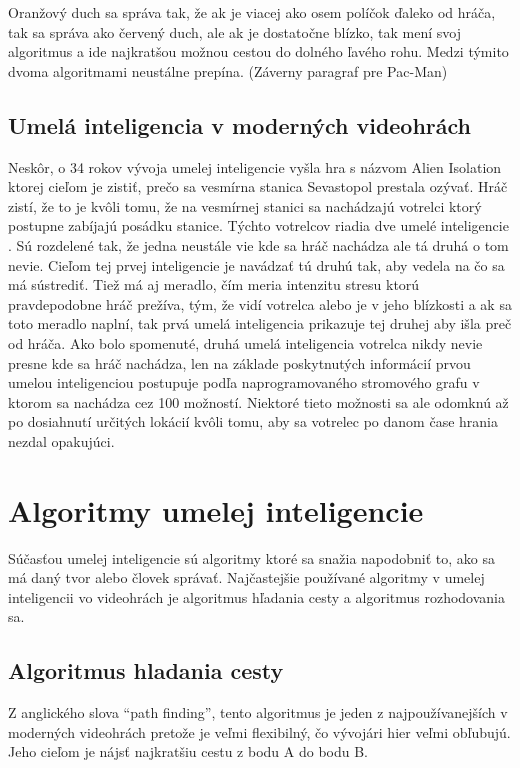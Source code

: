 \documentclass[10pt,oneside,slovak,a4paper]{article}
\begin{document}
Oranžový duch sa správa tak, že ak je viacej ako osem políčok ďaleko od hráča, tak sa správa ako červený duch, ale ak je dostatočne blízko, tak mení svoj algoritmus a ide najkratšou možnou cestou do dolného ľavého rohu. Medzi týmito dvoma algoritmami neustálne prepína.
(Záverny paragraf pre Pac-Man)

\subsection{Umelá inteligencia v moderných videohrách} \label{kapitola2.3}
Neskôr, o 34 rokov vývoja umelej inteligencie vyšla hra s názvom Alien Isolation ktorej cieľom je zistiť, prečo sa vesmírna stanica Sevastopol prestala ozývať. Hráč zistí, že to je kvôli tomu, že na vesmírnej stanici sa nachádzajú votrelci ktorý postupne zabíjajú posádku stanice. Týchto votrelcov riadia dve umelé inteligencie \cite{AlienIsolationAI}. Sú rozdelené tak, že jedna neustále vie kde sa hráč nachádza ale tá druhá o tom nevie. Cieľom tej prvej inteligencie je navádzať tú druhú tak, aby vedela na čo sa má sústrediť. Tiež má aj meradlo, čím meria intenzitu stresu ktorú pravdepodobne hráč prežíva, tým, že vidí votrelca alebo je v jeho blízkosti a ak sa toto meradlo naplní, tak prvá umelá inteligencia prikazuje tej druhej aby išla preč od hráča. Ako bolo spomenuté, druhá umelá inteligencia votrelca nikdy nevie presne kde sa hráč nachádza, len na základe poskytnutých informácií prvou umelou inteligenciou postupuje podľa naprogramovaného stromového grafu v ktorom sa nachádza cez 100 možností. Niektoré tieto možnosti sa ale odomknú až po dosiahnutí určitých lokácií kvôli tomu, aby sa votrelec po danom čase hrania nezdal opakujúci.


\section{Algoritmy umelej inteligencie} \label{kapitola3}
Súčasťou umelej inteligencie sú algoritmy ktoré sa snažia napodobniť to, ako sa má daný tvor alebo človek správať. Najčastejšie používané algoritmy v umelej inteligencii vo videohrách je algoritmus hľadania cesty a algoritmus rozhodovania sa.

\subsection{Algoritmus hladania cesty} \label{kapitola3.1}
Z anglického slova “path finding”, tento algoritmus je jeden z najpoužívanejších v moderných videohrách pretože je veľmi flexibilný, čo vývojári hier veľmi obľubujú. Jeho cieľom je nájsť najkratšiu cestu z bodu A do bodu B. 
\end{document}
